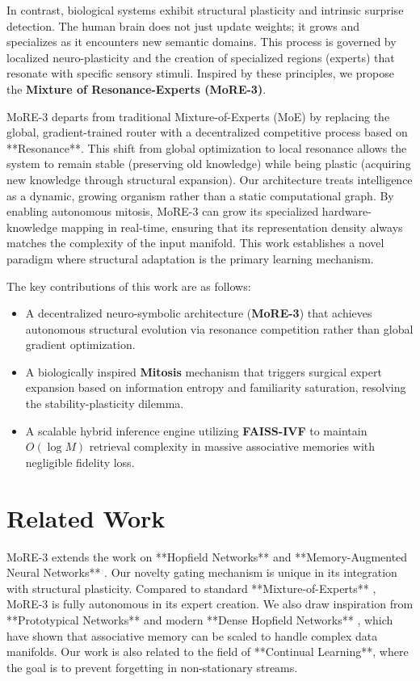 \documentclass[11pt,hidelinks]{article}
\begin{document}
In contrast, biological systems exhibit structural plasticity and intrinsic surprise detection. The human brain does not just update weights; it grows and specializes as it encounters new semantic domains. This process is governed by localized neuro-plasticity and the creation of specialized regions (experts) that resonate with specific sensory stimuli. Inspired by these principles, we propose the \textbf{Mixture of Resonance-Experts (MoRE-3)}. 

MoRE-3 departs from traditional Mixture-of-Experts (MoE) \citep{shazeer2017moe} by replacing the global, gradient-trained router with a decentralized competitive process based on **Resonance**. This shift from global optimization to local resonance allows the system to remain stable (preserving old knowledge) while being plastic (acquiring new knowledge through structural expansion). Our architecture treats intelligence as a dynamic, growing organism rather than a static computational graph. By enabling autonomous mitosis, MoRE-3 can grow its specialized hardware-knowledge mapping in real-time, ensuring that its representation density always matches the complexity of the input manifold. This work establishes a novel paradigm where structural adaptation is the primary learning mechanism.

The key contributions of this work are as follows:
\begin{itemize}
    \item A decentralized neuro-symbolic architecture (\textbf{MoRE-3}) that achieves autonomous structural evolution via resonance competition rather than global gradient optimization.
    \item A biologically inspired \textbf{Mitosis} mechanism that triggers surgical expert expansion based on information entropy and familiarity saturation, resolving the stability-plasticity dilemma.
    \item A scalable hybrid inference engine utilizing \textbf{FAISS-IVF} to maintain $O(\log M)$ retrieval complexity in massive associative memories with negligible fidelity loss.
\end{itemize}

\section{Related Work}
MoRE-3 extends the work on **Hopfield Networks** \citep{hopfield1982neural} and **Memory-Augmented Neural Networks** \citep{graves2016hybrid}. Our novelty gating mechanism is unique in its integration with structural plasticity. Compared to standard **Mixture-of-Experts** \citep{shazeer2017moe}, MoRE-3 is fully autonomous in its expert creation. We also draw inspiration from **Prototypical Networks** \citep{snell2017prototypical} and modern **Dense Hopfield Networks** \citep{ramsauer2020hopfield}, which have shown that associative memory can be scaled to handle complex data manifolds. Our work is also related to the field of **Continual Learning**, where the goal is to prevent forgetting in non-stationary streams.
\end{document}
